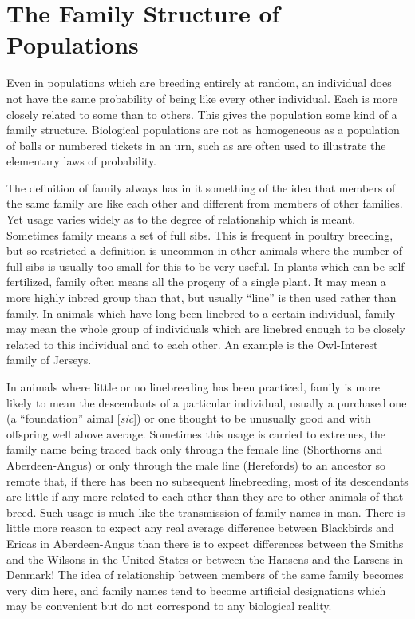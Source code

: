 \chapter{The Family Structure of Populations}
\label{cha:Lush_Chapter_24}

Even in populations which are breeding entirely at random, an
individual does not have the same probability of being like every other
individual. Each is more closely related to some than to others. This
gives the population some kind of a family structure. Biological populations
are not as homogeneous as a population of balls or numbered
tickets in an urn, such as are often used to illustrate the elementary
laws of probability.

The definition of family always has in it something of the idea that
members of the same family are like each other and different from
members of other families. Yet usage varies widely as to the degree of
relationship which is meant. Sometimes family means a set of full sibs.
This is frequent in poultry breeding, but so restricted a definition is
uncommon in other animals where the number of full sibs is usually too
small for this to be very useful. In plants which can be self-fertilized,
family often means all the progeny of a single plant. It may mean a
more highly inbred group than that, but usually ``line'' is then used
rather than family. In animals which have long been linebred to a certain
individual, family may mean the whole group of individuals which
are linebred enough to be closely related to this individual and to each
other. An example is the Owl-Interest family of Jerseys.

In animals where little or no linebreeding has been practiced, family
is more likely to mean the descendants of a particular individual,
usually a purchased one (a ``foundation'' aimal [\textit{sic}]) or one thought to be
unusually good and with offspring well above average. Sometimes this
usage is carried to extremes, the family name being traced back only
through the female line (Shorthorns and Aberdeen-Angus) or only
through the male line (Herefords) to an ancestor so remote that, if there
has been no subsequent linebreeding, most of its descendants are little
if any more related to each other than they are to other animals of that
breed. Such usage is much like the transmission of family names in
man. There is little more reason to expect any real average difference
between Blackbirds and Ericas in Aberdeen-Angus than there is to
expect differences between the Smiths and the Wilsons in the United
States or between the Hansens and the Larsens in Denmark! The idea
of relationship between members of the same family becomes very dim
here, and family names tend to become artificial designations which
may be convenient but do not correspond to any biological reality.

